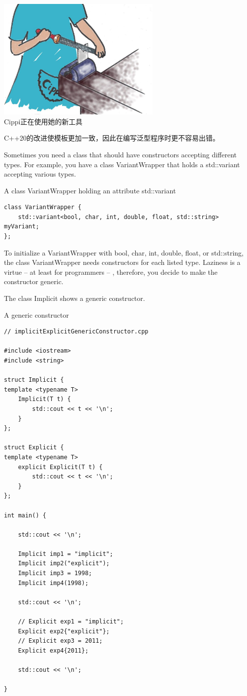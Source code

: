 \begin{center}
\includegraphics[width=0.6\textwidth]{content/3/chapter4/images/40.png}\\
Cippi正在使用她的新工具
\end{center}

C++20的改进使模板更加一致，因此在编写泛型程序时更不容易出错。


Sometimes you need a class that should have constructors accepting different types. For example, you have a class VariantWrapper that holds a std::variant accepting various types.

\noindent
A class VariantWrapper holding an attribute std::variant
\begin{lstlisting}[style=styleCXX]
class VariantWrapper {
	std::variant<bool, char, int, double, float, std::string> myVariant;
};
\end{lstlisting}

To initialize a VariantWrapper with bool, char, int, double, float, or std::string, the class VariantWrapper needs constructors for each listed type. Laziness is a virtue – at least for programmers – , therefore, you decide to make the constructor generic.

The class Implicit shows a generic constructor.

\noindent
A generic constructor
\begin{lstlisting}[style=styleCXX]
// implicitExplicitGenericConstructor.cpp

#include <iostream>
#include <string>

struct Implicit {
template <typename T>
	Implicit(T t) {
		std::cout << t << '\n';
	}
};

struct Explicit {
template <typename T>
	explicit Explicit(T t) {
		std::cout << t << '\n';
	}
};

int main() {
	
	std::cout << '\n';
	
	Implicit imp1 = "implicit";
	Implicit imp2("explicit");
	Implicit imp3 = 1998;
	Implicit imp4(1998);
	
	std::cout << '\n';
	
	// Explicit exp1 = "implicit";
	Explicit exp2{"explicit"};
	// Explicit exp3 = 2011;
	Explicit exp4{2011};
	
	std::cout << '\n';

}
\end{lstlisting}

